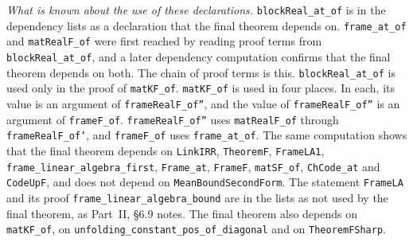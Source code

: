 \documentclass[11pt,letterpaper]{article}
\begin{document}
\emph{What is known about the use of these declarations.} \texttt{blockReal\_at\_of} is in the dependency lists
as a declaration that the final theorem depends on. \texttt{frame\_at\_of} and \texttt{matRealF\_of} were first reached by reading proof terms from \texttt{blockReal\_at\_of}, and a later dependency computation confirms that the final theorem depends on both. The chain of proof terms is this. \texttt{blockReal\_at\_of} is used only in the proof of
\texttt{matKF\_of}. \texttt{matKF\_of} is used in four places. In each, its value is an argument of
\texttt{frameRealF\_of''}, and the value of \texttt{frameRealF\_of''} is an argument of \texttt{frameF\_of}.
\texttt{frameRealF\_of''} uses \texttt{matRealF\_of} through \texttt{frameRealF\_of'}, and
\texttt{frameF\_of} uses \texttt{frame\_at\_of}. The same computation shows that the final theorem depends on \texttt{LinkIRR}, \texttt{TheoremF}, \texttt{FrameLA1},
\texttt{frame\_linear\_algebra\_first}, \texttt{Frame\_at}, \texttt{FrameF}, \texttt{matSF\_of},
\texttt{ChCode\_at} and \texttt{CodeUpF}, and does not depend on \texttt{MeanBoundSecondForm}. The statement \texttt{FrameLA} and its
proof \texttt{frame\_linear\_algebra\_bound} are in the lists as not used by the final theorem, as Part~II,
\S6.9 notes. The final theorem also depends on \texttt{matKF\_of}, on
\texttt{unfolding\_constant\_pos\_of\_diagonal} and on \texttt{TheoremFSharp}.
\end{document}
